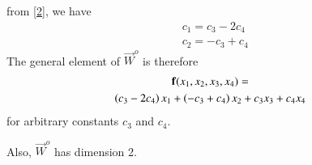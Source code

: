 \documentclass[journal,12pt,twocolumn]{IEEEtran}
\begin{document}
from \eqref{2}, we have
\begin{align}
& c_1 = c_3 - 2c_4 \\
& c_2 = -c_3 + c_4
\end{align}
The general element of $\vec{W}^{o}$ is therefore
\begin{multline}
\mathbf{f}(x_1,x_2,x_3,x_4) =\\
\left(c_3 - 2c_4\right)x_1 + \left(-c_3 + c_4\right)x_2 + c_3x_3 + c_4x_4
\end{multline}
for arbitrary constants $c_3$ and $c_4$. 

Also, $\vec{W}^{o}$ has dimension 2.
\end{document}
